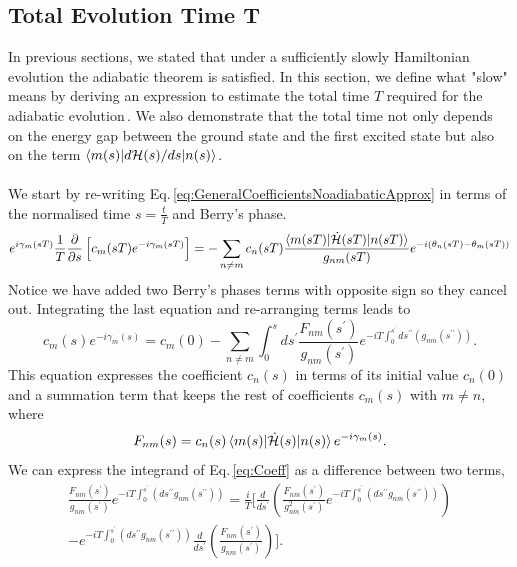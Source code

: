 \subsection{Total Evolution Time T}
In previous sections, we stated that under a sufficiently slowly Hamiltonian evolution the adiabatic theorem is satisfied. In this section, we define what "slow" means by deriving an expression to estimate the total time $T$ required for the adiabatic evolution\,\cite{Sarandy2005AdiabaticSystems}. We also demonstrate that the total time not only depends on the energy gap between the ground state and the first excited state but also on the term $\braket{m(s)|d\mathcal{H}(s)/ds|n(s)}$.\\\\
We start by re-writing Eq.\,\eqref{eq:GeneralCoefficientsNoadiabaticApprox} in terms of the normalised time $s = \frac{t}{T}$ and Berry's phase.
\begin{equation}
    e^{i\gamma_{m}(sT)}\frac{1}{T}\frac{\partial }{\partial s}\left[c_{m}(sT)e^{-i\gamma_{m}(sT)}\right] = -\sum_{n\neq m} c_{n}(sT) \frac{\braket{m(sT)|\dot{\mathcal{H}}(sT)|n(sT)}}{g_{nm}(sT)}e^{-i\left(\theta_{n}(sT) - \theta_{m}(sT)\right)}
\end{equation}
Notice we have added two Berry's phases terms with opposite sign so they cancel out. Integrating the last equation and re-arranging terms leads to
\begin{equation}
\label{eq:Coeff}
    c_{m}(s)e^{-i\gamma_{m}(s)} = c_{m}(0) - \sum_{n\neq m}\int_{0}^{s} ds^{\prime}\frac{F_{nm}(s^{\prime})}{g_{nm}(s^{\prime})}e^{-iT\int_{0}^{s^{\prime}}ds^{\prime\prime}\left(g_{nm}(s^{\prime\prime})\right)}.
\end{equation}
This equation expresses the coefficient $c_{n}(s)$ in terms of its initial value $c_{n}(0)$ and a summation term that keeps the rest of coefficients $c_{m}(s)$ with $m\neq n$, where
\begin{equation}
\label{eq:Fnm}
    F_{nm}(s) = c_{n}(s)\braket{m(s)|\dot{\mathcal{H}}(s)|n(s)} e^{-i\gamma_{m}(s)}.
\end{equation}
We can express the integrand of Eq.\,\eqref{eq:Coeff} as a difference between two terms,
\begin{align}
\frac{F_{nm}(s^{\prime})}{g_{nm}(s^{\prime})} e^{-iT\int_{0}^{s^{\prime}}\left(ds^{\prime \prime}g_{nm}(s^{\prime\prime}) \right)}= \frac{i}{T}\Biggl[\frac{d}{ds^{\prime}}\left(\frac{F_{nm}(s^{\prime})}{g^{2}_{nm}(s^{\prime})}e^{-iT\int_{0}^{s^{\prime}}\left(ds^{\prime \prime}g_{nm}(s^{\prime\prime}) \right)}\right)\\
 - e^{-iT\int_{0}^{s^{\prime}}\left(ds^{\prime \prime}g_{nm}(s^{\prime\prime}) \right)} \frac{d}{ds^{\prime}}\left(\frac{F_{nm}(s^{\prime})}{g_{nm}(s^{\prime})}\right)\Biggr].
 \end{align}
